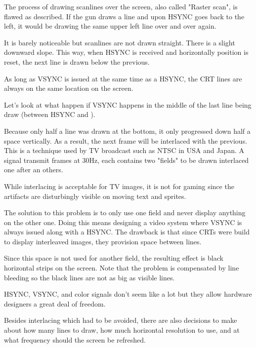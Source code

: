 The process of drawing scanlines over the screen, also called "Raster scan", is flawed as described. If the gun draws a line and upon HSYNC goes back to the left, it would be drawing the same upper left line over and over again. 

It is barely noticeable but scanlines are not drawn straight. There is a slight downward slope. This way, when HSYNC is received and horizontally position is reset, the next line is drawn below the previous.




As long as VSYNC is issued at the same time as a HSYNC, the CRT lines are always on the same location on the screen.

Let's look at what happen if VSYNC  happens in the middle of the last line being draw (between HSYNC  and ).


Because only half a line was drawn at the bottom, it only progressed down half a space vertically. As a result, the next frame will be interlaced with the previous. This is a technique used by TV broadcast such as NTSC in USA and Japan. A signal transmit frames at 30Hz, each contains two "fields" to be drawn interlaced one after an others.

While interlacing is acceptable for TV images, it is not for gaming since the artifacts are disturbingly visible on moving text and sprites. 

The solution to this problem is to only use one field and never display anything on the other one. Doing this means designing a video system where VSYNC is always issued along with a HSYNC. The drawback is that since CRTs were build to display interleaved images, they provision space between lines. 

Since this space is not used for another field, the resulting effect is black horizontal strips on the screen. Note that the problem is compensated by line bleeding so the black lines are not as big as visible lines.


HSYNC, VSYNC, and color signals don't seem like a lot but they allow hardware designers a great deal of freedom. 

Besides interlacing which had to be avoided, there are also decisions to make about how many lines to draw, how much horizontal resolution to use, and at what frequency should the screen be refreshed.





